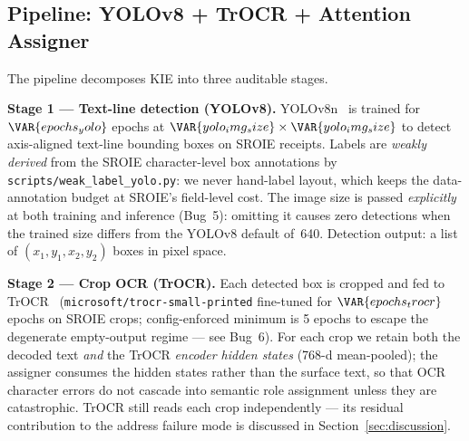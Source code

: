 \subsection{Pipeline: YOLOv8 + TrOCR + Attention Assigner}
\label{sec:pipeline_desc}

The pipeline decomposes KIE into three auditable stages.

\textbf{Stage 1 --- Text-line detection (YOLOv8).}
YOLOv8n~\cite{jocher2023yolov8} is trained for $\VAR{epochs_yolo}$ epochs
at $\VAR{yolo_img_size}\times\VAR{yolo_img_size}$ to detect axis-aligned
text-line bounding boxes on SROIE receipts.
Labels are \emph{weakly derived} from the SROIE character-level box
annotations by \texttt{scripts/weak\_label\_yolo.py}: we never hand-label
layout, which keeps the data-annotation budget at SROIE's field-level cost.
The image size is passed \emph{explicitly} at both training and
inference (Bug~5): omitting it causes zero detections when the
trained size differs from the YOLOv8 default of~640.
Detection output: a list of $(x_1,y_1,x_2,y_2)$ boxes in pixel space.

\textbf{Stage 2 --- Crop OCR (TrOCR).}
Each detected box is cropped and fed to
TrOCR~\cite{li2023trocr} (\texttt{microsoft/trocr-small-printed}
fine-tuned for $\VAR{epochs_trocr}$ epochs on SROIE crops;
config-enforced minimum is 5 epochs to escape the degenerate
empty-output regime --- see Bug~6).  For each crop we retain both
the decoded text \emph{and} the
TrOCR \emph{encoder hidden states} (768-d mean-pooled); the assigner
consumes the hidden states rather than the surface text, so that OCR
character errors do not cascade into semantic role assignment unless
they are catastrophic.  TrOCR still reads each crop independently ---
its residual contribution to the address failure mode is discussed in
Section~\ref{sec:discussion}.

